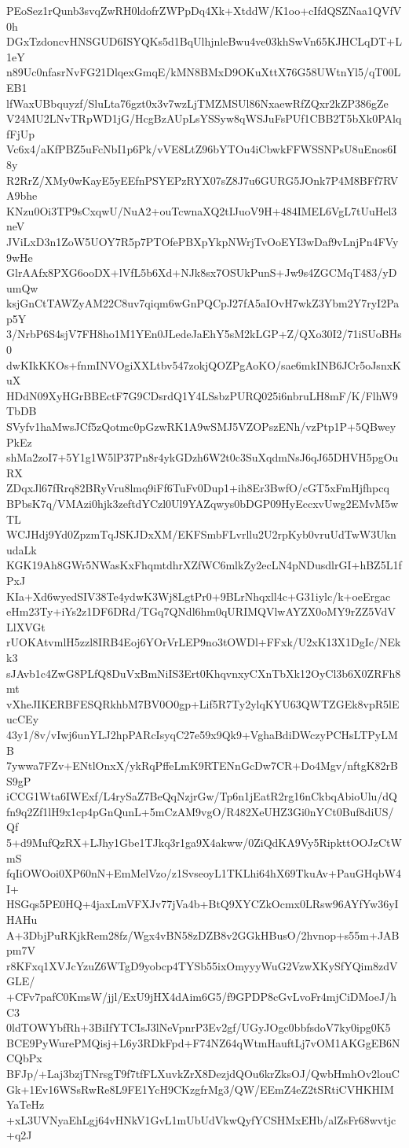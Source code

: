 PEoSez1rQunb3svqZwRH0ldofrZWPpDq4Xk+XtddW/K1oo+cIfdQSZNaa1QVfV0h
DGxTzdoncvHNSGUD6ISYQKs5d1BqUlhjnleBwu4ve03khSwVn65KJHCLqDT+L1eY
n89Uc0nfasrNvFG21DlqexGmqE/kMN8BMxD9OKuXttX76G58UWtnYl5/qT00LEB1
lfWaxUBbquyzf/SluLta76gzt0x3v7wzLjTMZMSUl86NxaewRfZQxr2kZP386gZe
V24MU2LNvTRpWD1jG/HcgBzAUpLsYSSyw8qWSJuFsPUf1CBB2T5bXk0PAlqfFjUp
Vc6x4/aKfPBZ5uFcNbI1p6Pk/vVE8LtZ96bYTOu4iCbwkFFWSSNPsU8uEnos6I8y
R2RrZ/XMy0wKayE5yEEfnPSYEPzRYX07sZ8J7u6GURG5JOnk7P4M8BFf7RVA9bhe
KNzu0Oi3TP9sCxqwU/NuA2+ouTcwnaXQ2tIJuoV9H+484IMEL6VgL7tUuHel3neV
JViLxD3n1ZoW5UOY7R5p7PTOfePBXpYkpNWrjTvOoEYI3wDaf9vLnjPn4FVy9wHe
GlrAAfx8PXG6ooDX+lVfL5b6Xd+NJk8sx7OSUkPunS+Jw9s4ZGCMqT483/yDumQw
ksjGnCtTAWZyAM22C8uv7qiqm6wGnPQCpJ27fA5aIOvH7wkZ3Ybm2Y7ryI2Pap5Y
3/NrbP6S4sjV7FH8ho1M1YEn0JLedeJaEhY5sM2kLGP+Z/QXo30I2/71iSUoBHs0
dwKIkKKOs+fnmINVOgiXXLtbv547zokjQOZPgAoKO/sae6mkINB6JCr5oJsnxKuX
HDdN09XyHGrBBEctF7G9CDsrdQ1Y4LSsbzPURQ025i6nbruLH8mF/K/FlhW9TbDB
SVyfv1haMwsJCf5zQotmc0pGzwRK1A9wSMJ5VZOPszENh/vzPtp1P+5QBweyPkEz
shMa2zoI7+5Y1g1W5lP37Pn8r4ykGDzh6W2t0c3SuXqdmNsJ6qJ65DHVH5pgOuRX
ZDqxJl67fRrq82BRyVru8lmq9iFf6TuFv0Dup1+ih8Er3BwfO/cGT5xFmHjfhpcq
BPbsK7q/VMAzi0hjk3zeftdYCzl0Ul9YAZqwys0bDGP09HyEccxvUwg2EMvM5wTL
WCJHdj9Yd0ZpzmTqJSKJDxXM/EKFSmbFLvrllu2U2rpKyb0vruUdTwW3UknudaLk
KGK19Ah8GWr5NWasKxFhqmtdhrXZfWC6mlkZy2ecLN4pNDusdlrGI+hBZ5L1fPxJ
KIa+Xd6wyedSIV38Te4ydwK3Wj8LgtPr0+9BLrNhqxll4c+G31iylc/k+oeErgac
eHm23Ty+iYs2z1DF6DRd/TGq7QNdl6hm0qURIMQVlwAYZX0oMY9rZZ5VdVLlXVGt
rUOKAtvmlH5zzl8IRB4Eoj6YOrVrLEP9no3tOWDl+FFxk/U2xK13X1DgIc/NEkk3
sJAvb1c4ZwG8PLfQ8DuVxBmNiIS3Ert0KhqvnxyCXnTbXk12OyCl3b6X0ZRFh8mt
vXheJIKERBFESQRkhbM7BV0O0gp+Lif5R7Ty2ylqKYU63QWTZGEk8vpR5lEucCEy
43y1/8v/vIwj6unYLJ2hpPARcIsyqC27e59x9Qk9+VghaBdiDWczyPCHsLTPyLMB
7ywwa7FZv+ENtlOnxX/ykRqPffeLmK9RTENnGcDw7CR+Do4Mgv/nftgK82rBS9gP
iCCG1Wta6IWExf/L4rySaZ7BeQqNzjrGw/Tp6n1jEatR2rg16nCkbqAbioUlu/dQ
fn9q2Zf1lH9x1cp4pGnQunL+5mCzAM9vgO/R482XeUHZ3Gi0nYCt0Buf8diUS/Qf
5+d9MufQzRX+LJhy1Gbe1TJkq3r1ga9X4akww/0ZiQdKA9Vy5RipkttOOJzCtWmS
fqIiOWOoi0XP60nN+EmMelVzo/z1SvseoyL1TKLhi64hX69TkuAv+PauGHqbW4I+
HSGqs5PE0HQ+4jaxLmVFXJv77jVa4b+BtQ9XYCZkOcmx0LRsw96AYfYw36yIHAHu
A+3DbjPuRKjkRem28fz/Wgx4vBN58zDZB8v2GGkHBusO/2hvnop+s55m+JABpm7V
r8KFxq1XVJcYzuZ6WTgD9yobcp4TYSb55ixOmyyyWuG2VzwXKySfYQim8zdVGLE/
+CFv7pafC0KmsW/jjl/ExU9jHX4dAim6G5/f9GPDP8cGvLvoFr4mjCiDMoeJ/hC3
0ldTOWYbfRh+3BiIfYTCIsJ3lNeVpnrP3Ev2gf/UGyJOgc0bbfsdoV7ky0ipg0K5
BCE9PyWurePMQisj+L6y3RDkFpd+F74NZ64qWtmHauftLj7vOM1AKGgEB6NCQbPx
BFJp/+Laj3bzjTNrsgT9f7tfFLXuvkZrX8DezjdQOu6krZksOJ/QwbHmhOv2louC
Gk+1Ev16WSsRwRe8L9FE1YcH9CKzgfrMg3/QW/EEmZ4eZ2tSRtiCVHKHIMYaTeHz
+xL3UVNyaEhLgj64vHNkV1GvL1mUbUdVkwQyfYCSHMxEHb/alZsFr68wvtjc+q2J
